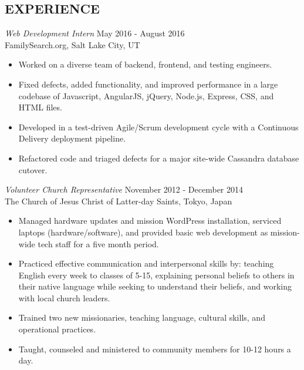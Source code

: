 \documentclass[margin, 10pt]{res} %
\begin{document}
\begin{resume}
\section{EXPERIENCE}

{\sl Web Development Intern} \hfill May 2016 - August 2016 \\
FamilySearch.org, Salt Lake City, UT
\begin{itemize}
\item Worked on a diverse team of backend, frontend, and testing engineers.
\item Fixed defects, added functionality, and improved performance in a large codebase of Javascript, AngularJS,  jQuery, Node.js, Express, CSS, and HTML files.
\item Developed in a test-driven Agile/Scrum development cycle with a Continuous Delivery deployment pipeline.
\item Refactored code and triaged defects for a major site-wide Cassandra database cutover.
\end{itemize}

{\sl Volunteer Church Representative} \hfill November 2012 - December 2014 \\
The Church of Jesus Christ of Latter-day Saints, Tokyo, Japan
\begin{itemize} \itemsep -2pt %
  \item Managed hardware updates and mission WordPress installation, serviced laptops (hardware/software), and provided basic web development as mission-wide tech staff for a five month period.
\item Practiced effective communication and interpersonal skills by: teaching English every week to classes of 5-15, explaining personal beliefs to others in their native language while seeking to understand their beliefs, and working with local church leaders. 
\item Trained two new missionaries, teaching language, cultural skills, and operational practices.
\item Taught, counseled and ministered to community members for 10-12 hours a day.
\end{itemize}



%


\end{resume}
\end{document}
